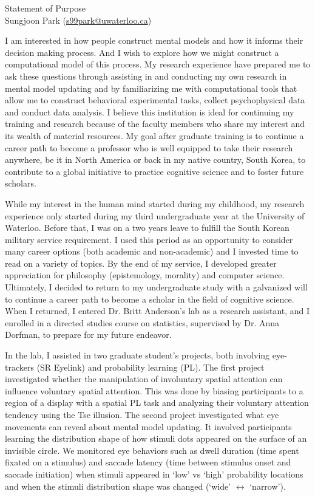 \documentclass[12pt]{article}
\let\oldcenter\center
\let\oldendcenter\endcenter
\renewenvironment{center}{\setlength\topsep{-1pt}\oldcenter}{\oldendcenter}
\begin{document}
	
	\begin{center}
		{\Large Statement of Purpose} \\
		{\normalsize Sungjoon Park (\href{mailto:s99park@uwaterloo.ca}{s99park@uwaterloo.ca})}
	\end{center}
	
	I am interested in how people construct mental models and how it informs their decision making process. And I wish to explore how we might construct a computational model of this process. My research experience have prepared me to ask these questions through assisting in and conducting my own research in mental model updating and by familiarizing me with computational tools that allow me to construct behavioral experimental tasks, collect psychophysical data and conduct data analysis. I believe this institution is ideal for continuing my training and research because of the faculty members who share my interest and its wealth of material resources. My goal after graduate training is to continue a career path to become a professor who is well equipped to take their research anywhere, be it in North America or back in my native country, South Korea, to contribute to a global initiative to practice cognitive science and to foster future scholars.
	
	While my interest in the human mind started during my childhood, my research experience only started during my third undergraduate year at the University of Waterloo. Before that, I was on a two years leave to fulfill the South Korean military service requirement. I used this period as an opportunity to consider many career options (both academic and non-academic) and I invested time to read on a variety of topics. By the end of my service, I developed greater appreciation for philosophy (epistemology, morality) and computer science. Ultimately, I decided to return to my undergraduate study with a galvanized will to continue a career path to become a scholar in the field of cognitive science. When I returned, I entered Dr. Britt Anderson’s lab as a research assistant, and I enrolled in a directed studies course on statistics, supervised by Dr. Anna Dorfman, to prepare for my future endeavor.
	
	In the lab, I assisted in two graduate student's projects, both involving eye-trackers (SR Eyelink) and probability learning (PL). The first project investigated whether the manipulation of involuntary spatial attention can influence voluntary spatial attention. This was done by biasing participants to a region of a display with a spatial PL task and analyzing their voluntary attention tendency using the Tse illusion. The second project investigated what eye movements can reveal about mental model updating. It involved participants learning the distribution shape of how stimuli dots appeared on the surface of an invisible circle. We monitored eye behaviors such as dwell duration (time spent fixated on a stimulus) and saccade latency (time between stimulus onset and saccade initiation) when stimuli appeared in `low' vs `high' probability locations and when the stimuli distribution shape was changed (`wide' $\leftrightarrow$ `narrow').
	
\end{document}
